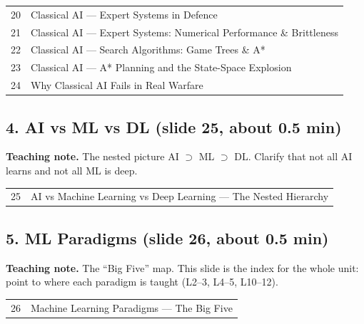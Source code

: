 \documentclass[11pt]{article}
\begin{document}
\begin{center}\small\renewcommand{\arraystretch}{1.1}\begin{tabularx}{\textwidth}{@{}r X@{}}20 & Classical AI --- Expert Systems in Defence\\
21 & Classical AI --- Expert Systems: Numerical Performance \& Brittleness\\
22 & Classical AI --- Search Algorithms: Game Trees \& A*\\
23 & Classical AI --- A* Planning and the State-Space Explosion\\
24 & Why Classical AI Fails in Real Warfare\\\end{tabularx}\end{center}

\subsection{4. AI vs ML vs DL \normalfont\small\color{GreyN}(slide 25, about 0.5 min)}

\textbf{Teaching note.} The nested picture AI $\supset$ ML $\supset$ DL. Clarify that not all AI learns and not all ML is deep.

\begin{center}\small\renewcommand{\arraystretch}{1.1}\begin{tabularx}{\textwidth}{@{}r X@{}}25 & AI vs Machine Learning vs Deep Learning --- The Nested Hierarchy\\\end{tabularx}\end{center}

\subsection{5. ML Paradigms \normalfont\small\color{GreyN}(slide 26, about 0.5 min)}

\textbf{Teaching note.} The ``Big Five'' map. This slide is the index for the whole unit: point to where each paradigm is taught (L2--3, L4--5, L10--12).

\begin{center}\small\renewcommand{\arraystretch}{1.1}\begin{tabularx}{\textwidth}{@{}r X@{}}26 & Machine Learning Paradigms --- The Big Five\\\end{tabularx}\end{center}
\end{document}
